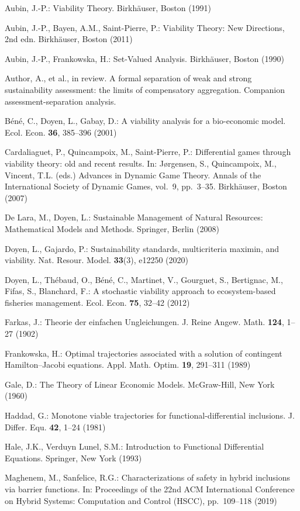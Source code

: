 \documentclass[11pt]{article}
\begin{document}
Aubin, J.-P.: Viability Theory. Birkh\"auser, Boston (1991)

Aubin, J.-P., Bayen, A.M., Saint-Pierre, P.: Viability Theory: New
Directions, 2nd edn. Birkh\"auser, Boston (2011)

Aubin, J.-P., Frankowska, H.: Set-Valued Analysis. Birkh\"auser, Boston
(1990)

Author, A., et al., in review. A formal separation of weak and strong
sustainability assessment: the limits of compensatory aggregation.
Companion assessment-separation analysis.

B\'en\'e, C., Doyen, L., Gabay, D.: A viability analysis for a bio-economic
model. Ecol. Econ. \textbf{36}, 385--396 (2001)

Cardaliaguet, P., Quincampoix, M., Saint-Pierre, P.: Differential games
through viability theory: old and recent results. In: J\o{}rgensen, S.,
Quincampoix, M., Vincent, T.L. (eds.) Advances in Dynamic Game Theory.
Annals of the International Society of Dynamic Games, vol.~9, pp.~3--35.
Birkh\"auser, Boston (2007)

De Lara, M., Doyen, L.: Sustainable Management of Natural Resources:
Mathematical Models and Methods. Springer, Berlin (2008)

Doyen, L., Gajardo, P.: Sustainability standards, multicriteria maximin,
and viability. Nat. Resour. Model. \textbf{33}(3), e12250 (2020)

Doyen, L., Th\'ebaud, O., B\'en\'e, C., Martinet, V., Gourguet, S., Bertignac,
M., Fifas, S., Blanchard, F.: A stochastic viability approach to
ecosystem-based fisheries management. Ecol. Econ. \textbf{75}, 32--42
(2012)

Farkas, J.: Theorie der einfachen Ungleichungen. J. Reine Angew. Math.
\textbf{124}, 1--27 (1902)

Frankowska, H.: Optimal trajectories associated with a solution of
contingent Hamilton--Jacobi equations. Appl. Math. Optim. \textbf{19},
291--311 (1989)

Gale, D.: The Theory of Linear Economic Models. McGraw-Hill, New York
(1960)

Haddad, G.: Monotone viable trajectories for functional-differential
inclusions. J. Differ. Equ. \textbf{42}, 1--24 (1981)

Hale, J.K., Verduyn Lunel, S.M.: Introduction to Functional Differential
Equations. Springer, New York (1993)

Maghenem, M., Sanfelice, R.G.: Characterizations of safety in hybrid
inclusions via barrier functions. In: Proceedings of the 22nd ACM
International Conference on Hybrid Systems: Computation and Control
(HSCC), pp.~109--118 (2019)
\end{document}
